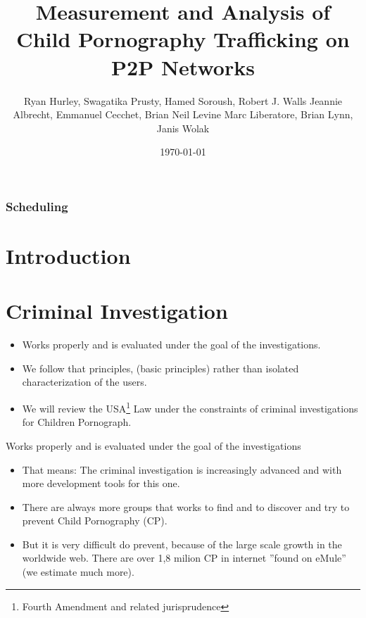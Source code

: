 \documentclass[notes]{beamer}
\title{Measurement and Analysis of Child Pornography Trafficking on P2P Networks\nocite{Hurley}}
\subtitle{}
\institute{Instituto de Computação - Unicamp}
\date{\today}
\author{Ryan Hurley, Swagatika Prusty, Hamed Soroush, Robert J. Walls
Jeannie Albrecht, Emmanuel Cecchet, Brian Neil Levine
Marc Liberatore, Brian Lynn, Janis Wolak}
\begin{document}


\begin{frame}
  \titlepage
\end{frame}

\begin{frame}
  \frametitle{Scheduling}
  \tableofcontents
\end{frame}

\section{Introduction} 
\begin{frame} %

\end{frame}

\section{Criminal Investigation}
\begin{frame}

\begin{itemize} 
    \item[\checkmark] Works properly and is evaluated under the goal of the investigations.
    
    \item[\checkmark] We follow that principles, (basic principles) rather than isolated characterization of the users.
    
    \item[\checkmark] We will review the USA\footnote{Fourth Amendment and related jurisprudence} Law under the constraints of criminal investigations for Children Pornograph.
\end{itemize}

\end{frame}

\begin{frame}
\begin{block}{Works properly and is evaluated under the goal of the investigations}

\begin{itemize}

\item[\checkmark]That  means: The criminal investigation is increasingly advanced and with more development tools for this one. 

\item[\checkmark]There are always more groups that works to find and to discover and try to prevent Child Pornography (CP).

\item[\checkmark]But it is very difficult do prevent, because of the large scale growth in the worldwide web. There are over 1,8 milion CP in internet ''found on eMule'' (we estimate much more).

\end{itemize}

\end{block}

\end{frame}
\end{document}
